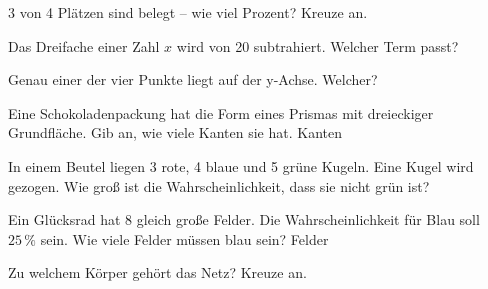 \documentclass[11pt]{article}
\begin{document}
\begin{aufgabe}{3 von 4 Plätzen sind belegt – wie viel Prozent? Kreuze an. \\    }
\end{aufgabe}

\begin{aufgabe}{Das Dreifache einer Zahl $x$ wird von 20 subtrahiert. Welcher Term passt? \\    }
\end{aufgabe}

\begin{aufgabe}{Genau einer der vier Punkte liegt auf der y-Achse. Welcher? \\    }
\end{aufgabe}

\begin{aufgabe}{Eine Schokoladenpackung hat die Form eines Prismas mit dreieckiger Grundfläche. Gib an, wie viele Kanten sie hat. \leerfeld Kanten}
\end{aufgabe}

\begin{aufgabe}{In einem Beutel liegen 3 rote, 4 blaue und 5 grüne Kugeln. Eine Kugel wird gezogen. Wie groß ist die Wahrscheinlichkeit, dass sie nicht grün ist? \leerfeld}
\end{aufgabe}

\begin{aufgabe}{Ein Glücksrad hat $8$ gleich große Felder. Die Wahrscheinlichkeit für Blau soll $25\,\%$ sein. Wie viele Felder müssen blau sein? \leerfeld Felder}
\end{aufgabe}

\begin{aufgabe}{\begin{minipage}[t]{0.6\linewidth}Zu welchem Körper gehört das Netz? Kreuze an. \\   \end{minipage}\hfill\begin{minipage}[t]{0.37\linewidth}\vspace{0pt}
\end{minipage}}
\end{aufgabe}
\end{document}

